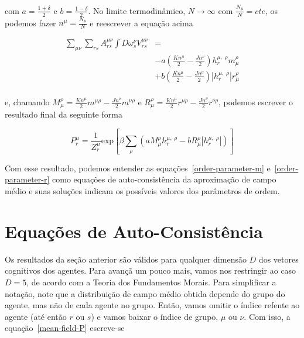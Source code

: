 \documentclass[a4paper, 11pt]{article} %
\newcommand{\agent}[2]{%
    \omega^{#2}_{#1}}
\newcommand{\pot}{\ensuremath{\displaystyle%
    V_{rs}^{\mu \nu}}}
\newcommand{\opn}[2]{\ensuremath{\displaystyle%
    h^{#2,\;\rho}_{#1}}}
\newcommand{\mh}[1]{\ensuremath{\displaystyle%
    m^{\rho}_{#1}}}
\newcommand{\rh}[1]{\ensuremath{\displaystyle%
    r^{\rho}_{#1}}}
\newcommand{\Mh}[1]{\ensuremath{\displaystyle%
    M^{\rho}_{#1}}}
\newcommand{\Rh}[1]{\ensuremath{\displaystyle%
    R^{\rho}_{#1}}}
\newcommand{\inp}[1]{\ensuremath{\displaystyle%
    \left(#1\right)}}
\newcommand{\ins}[1]{\ensuremath{\displaystyle%
    \left[#1\right]}}
\begin{document}
com $a=\frac{1+\delta}{2}$ e $b=\frac{1-\delta}{2}$. No limite termodinâmico, 
$N \to \infty$ com $\frac{N_{\mu}}{N} = \textit{cte}$,
os podemos fazer $n^{\mu} = \frac{N_{\mu}}{N}$ e reescrever a equação acima

\begin{equation}
    \begin{split}
        \sum_{\mu\nu}\sum_{rs}A^{\mu\nu}_{rs}\int D\agent{s}{\nu} \pot & = \\
        & 
        -a\inp{\frac{Kn^{\mu}}{2}-\frac{Jn^{\nu}}{2}}\opn{r}{\mu}\mh{\mu}\\
        &
        +b\inp{\frac{Kn^{\mu}}{2}-\frac{Jn^{\nu}}{2}}|
        \opn{r}{\mu}|\rh{\mu}\\
    \end{split}
\end{equation}

e, chamando $\Mh{\mu} =
\frac{Kn^{\mu}}{2}m^{\mu\rho}-\frac{Jn^{\nu}}{2}m^{\nu\rho} $ e $\Rh{\mu}
= \frac{Kn^{\mu}}{2}r^{\mu\rho}-\frac{Jn^{\nu}}{2}r^{\nu\rho}$, podemos escrever
o resultado final da seguinte forma

\begin{equation}\label{mean-field-P}
    P_r^{\mu} = \frac{1}{Z_r^{\mu}} \mathrm{exp} \ins{%
        \beta\sum_{\rho}\inp{a\Mh{\mu}\opn{r}{\mu}-b\Rh{\mu}|\opn{r}{\mu}|}}
\end{equation}

Com esse resultado, podemos entender as equações~\ref{order-parameter-m} 
e~\ref{order-parameter-r} como equações de auto-consistência da aproximação de
campo médio e suas soluções indicam os possíveis valores dos parâmetros de
ordem. 


\section*{Equações de Auto-Consistência}

Os resultados da seção anterior são válidos para qualquer dimensão $D$ dos
vetores cognitivos dos agentes. Para avançã um pouco mais, vamos nos restringir
ao caso $D=5$, de acordo com a Teoria dos Fundamentos Morais. Para simplificar a
notação, note que a distribuição de campo médio obtida depende do grupo do
agente, mas não de cada agente no grupo. Então, vamos omitir o índice refente ao
agente (até então $r$ ou $s$) e vamos baixar o índice de grupo, $\mu$ ou $\nu$.
Com isso, a equação~\ref{mean-field-P} escreve-se 
\end{document}
